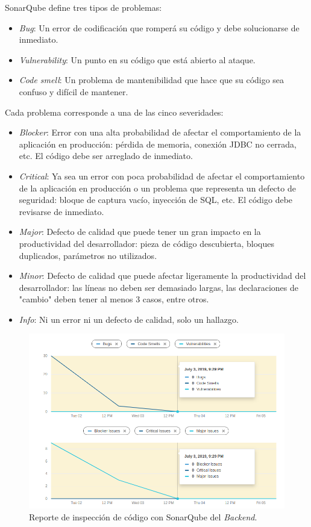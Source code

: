 SonarQube define tres tipos de problemas:

\begin{itemize}
    \item \textit{Bug}: Un error de codificación que romperá su código y debe solucionarse de inmediato.
    \item \textit{Vulnerability}: Un punto en su código que está abierto al ataque.
    \item \textit{Code smell}: Un problema de mantenibilidad que hace que su código sea confuso y difícil de mantener.
\end{itemize}

Cada problema corresponde a una de las cinco severidades:

\begin{itemize}
    \item \textit{Blocker}: Error con una alta probabilidad de afectar el comportamiento de la aplicación en producción: pérdida de memoria, conexión JDBC no cerrada, etc. El código debe ser arreglado de inmediato.
    \item \textit{Critical}: Ya sea un error con poca probabilidad de afectar el comportamiento de la aplicación en producción o un problema que representa un defecto de seguridad: bloque de captura vacío, inyección de SQL, etc. El código debe revisarse de inmediato.
    \item \textit{Major}: Defecto de calidad que puede tener un gran impacto en la productividad del desarrollador: pieza de código descubierta, bloques duplicados, parámetros no utilizados.
    \item \textit{Minor}: Defecto de calidad que puede afectar ligeramente la productividad del desarrollador: las líneas no deben ser demasiado largas, las declaraciones de "cambio" deben tener al menos 3 casos, entre otros.
    \item \textit{Info}: Ni un error ni un defecto de calidad, solo un hallazgo.
\end{itemize}

\begin{figure}[htbp]
    \centering
    \includegraphics[width=\textwidth]{reporteQA_BE.png}
    \caption{Reporte de inspección de código con SonarQube del \textit{Backend}.}
    \label{fig:QAbackend}
\end{figure}

